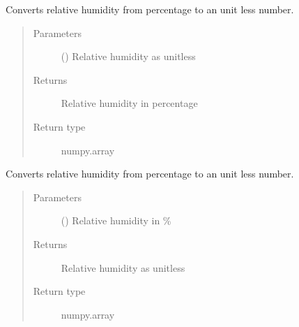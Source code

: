 \documentclass[letterpaper,10pt,english]{sphinxmanual}
\begin{document}

\begin{fulllineitems}
\label{\detokenize{air:livestock.air.convert_relative_humidity_to_percentage}}
Converts relative humidity from percentage to an unit less number.
\begin{quote}\begin{description}
\item[{Parameters}] \leavevmode
{} () \textendash{} Relative humidity as unitless

\item[{Returns}] \leavevmode
Relative humidity in percentage

\item[{Return type}] \leavevmode
numpy.array

\end{description}\end{quote}

\end{fulllineitems}


\begin{fulllineitems}
\label{\detokenize{air:livestock.air.convert_relative_humidity_to_unitless}}
Converts relative humidity from percentage to an unit less number.
\begin{quote}\begin{description}
\item[{Parameters}] \leavevmode
{} () \textendash{} Relative humidity in \%

\item[{Returns}] \leavevmode
Relative humidity as unitless

\item[{Return type}] \leavevmode
numpy.array

\end{description}\end{quote}

\end{fulllineitems}
\end{document}
